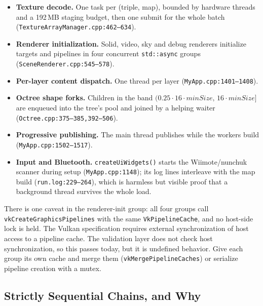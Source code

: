 \documentclass[11pt,a4paper]{article}
\begin{document}
\begin{itemize}[leftmargin=1.4em,itemsep=2pt]
\item \textbf{Texture decode.} One task per (triple, map), bounded by
hardware threads and a 192\,MB staging budget, then one submit for the whole
batch (\texttt{TextureArrayManager.cpp:462--634}).
\item \textbf{Renderer initialization.} Solid, video, sky and debug renderers
initialize targets and pipelines in four concurrent \texttt{std::async}
groups (\texttt{SceneRenderer.cpp:545--578}).
\item \textbf{Per-layer content dispatch.} One thread per layer
(\texttt{MyApp.cpp:1401--1408}).
\item \textbf{Octree shape forks.} Children in the band
$(0.25\cdot16\cdot minSize,\,16\cdot minSize]$ are enqueued into the tree's
pool and joined by a helping waiter (\texttt{Octree.cpp:375--385,392--506}).
\item \textbf{Progressive publishing.} The main thread publishes while the
workers build (\texttt{MyApp.cpp:1502--1517}).
\item \textbf{Input and Bluetooth.} \texttt{createUiWidgets()} starts the
Wiimote/nunchuk scanner during setup (\texttt{MyApp.cpp:1148}); its log lines
interleave with the map build (\texttt{run.log:229--264}), which is harmless
but visible proof that a background thread survives the whole load.
\end{itemize}

There is one caveat in the renderer-init group: all four groups call
\texttt{vkCreateGraphicsPipelines} with the same \texttt{VkPipelineCache},
and no host-side lock is held. The Vulkan specification requires external
synchronization of host access to a pipeline cache. The validation layer
does not check host synchronization, so this passes today, but it is
undefined behavior. Give each group its own cache and merge them
(\texttt{vkMergePipelineCaches}) or serialize pipeline creation with a mutex.

\subsection{Strictly Sequential Chains, and Why}
\end{document}
